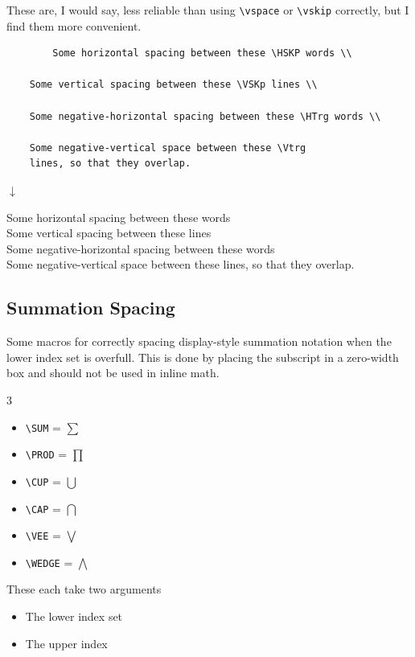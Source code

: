\documentclass{article}
\begin{document}
These are, I would say, less reliable than using \verb|\vspace| or \verb|\vskip| correctly, but I find them more convenient.
\begin{tcolorbox}
	\begin{verbatim}
		Some horizontal spacing between these \HSKP words \\

	Some vertical spacing between these \VSKp lines \\

	Some negative-horizontal spacing between these \HTrg words \\
	
	Some negative-vertical space between these \Vtrg
	lines, so that they overlap.
	\end{verbatim}
	\begin{center}$\downarrow$\end{center}
	\Vskp
	Some horizontal spacing between these \HSKP words \\
	
	Some vertical spacing between these \VSKp lines \\
	
	Some negative-horizontal spacing between these \HTrg words \\
	
	Some negative-vertical space between these \Vtrg
	lines, so that they overlap.
\end{tcolorbox}



\subsection*{Summation Spacing}

Some macros for correctly spacing display-style summation notation when the lower index set is overfull. This is done by placing the subscript in a zero-width box and should not be used in inline math.
	\vtrg\begin{multicols}{3}
	\begin{itemize}
	\item \verb|\SUM|   = $\displaystyle\sum$
	\item \verb|\PROD|  = $\displaystyle\prod$
	\item \verb|\CUP|   = $\displaystyle\bigcup$
	\item \verb|\CAP|   = $\displaystyle\bigcap$
	\item \verb|\VEE|   = $\displaystyle\bigvee$
	\item \verb|\WEDGE| = $\displaystyle\bigwedge$
	\end{itemize}
	\end{multicols}\Vtrg\vtrg
These each take two arguments
	\begin{itemize}
		\item[\texttt M.] The lower index set
		\item[\texttt O.] The upper index
	\end{itemize}
	
\end{document}
